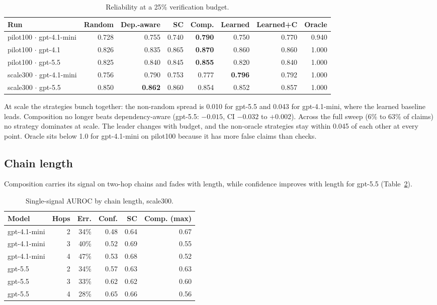 \documentclass[11pt]{article}
\begin{document}
\begin{table}[h]
\centering
\small
\caption{Reliability at a 25\% verification budget.}
\label{tab:budget}
\begin{tabular}{lrrrrrrr}
\toprule
Run & Random & Dep.-aware & SC & Comp. & Learned & Learned+C & Oracle \\
\midrule
pilot100 $\cdot$ gpt-4.1-mini & 0.728 & 0.755 & 0.740 & \textbf{0.790} & 0.750 & 0.770 & 0.940 \\
pilot100 $\cdot$ gpt-4.1 & 0.826 & 0.835 & 0.865 & \textbf{0.870} & 0.860 & 0.860 & 1.000 \\
pilot100 $\cdot$ gpt-5.5 & 0.825 & 0.840 & 0.845 & \textbf{0.855} & 0.820 & 0.840 & 1.000 \\
scale300 $\cdot$ gpt-4.1-mini & 0.756 & 0.790 & 0.753 & 0.777 & \textbf{0.796} & 0.792 & 1.000 \\
scale300 $\cdot$ gpt-5.5 & 0.850 & \textbf{0.862} & 0.860 & 0.854 & 0.852 & 0.857 & 1.000 \\
\bottomrule
\end{tabular}
\end{table}

At scale the strategies bunch together: the non-random spread is 0.010 for gpt-5.5 and 0.043
for gpt-4.1-mini, where the learned baseline leads. Composition no longer beats
dependency-aware (gpt-5.5: $-0.015$, CI $-0.032$ to $+0.002$). Across the full sweep (6\% to
63\% of claims) no strategy dominates at scale. The leader changes with budget, and the
non-oracle strategies stay within 0.045 of each other at every point. Oracle sits below 1.0
for gpt-4.1-mini on pilot100 because it has more false claims than checks.

\subsection{Chain length}
Composition carries its signal on two-hop chains and fades with length, while confidence
improves with length for gpt-5.5 (Table~\ref{tab:hops}).

\begin{table}[h]
\centering
\small
\caption{Single-signal AUROC by chain length, scale300.}
\label{tab:hops}
\begin{tabular}{lrrrrr}
\toprule
Model & Hops & Err. & Conf. & SC & Comp. (max) \\
\midrule
gpt-4.1-mini & 2 & 34\% & 0.48 & 0.64 & 0.67 \\
gpt-4.1-mini & 3 & 40\% & 0.52 & 0.69 & 0.55 \\
gpt-4.1-mini & 4 & 47\% & 0.53 & 0.68 & 0.52 \\
gpt-5.5 & 2 & 34\% & 0.57 & 0.63 & 0.63 \\
gpt-5.5 & 3 & 33\% & 0.62 & 0.62 & 0.60 \\
gpt-5.5 & 4 & 28\% & 0.65 & 0.66 & 0.56 \\
\bottomrule
\end{tabular}
\end{table}
\end{document}
